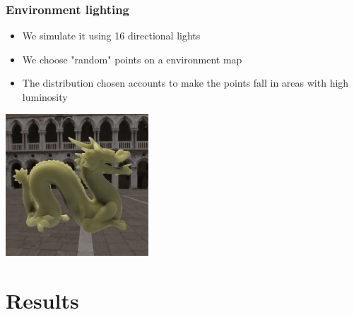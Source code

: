 \documentclass{beamer}
\begin{document}
\begin{frame}
    \frametitle{Environment lighting}
\begin{itemize}
	\item We simulate it using 16 directional lights 
	\item We choose "random" points on a environment map 
	\item The distribution chosen accounts to make the points fall in areas with high luminosity
\end{itemize}
      \centering
		\includegraphics[width=0.4\textwidth]{skymap}
\end{frame}

\section{Results}
\end{document}
